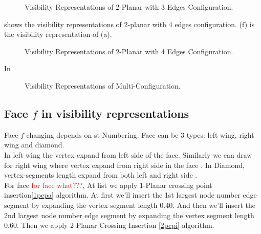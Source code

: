 \begin{figure}[!tb]
\centering
\resizebox{150mm}{!}{}
\caption{Visibility Representations of 2-Planar with 3 Edges Configuration.}
\label{fig:2planar3edgesvisi}
\end{figure}



 shows the visibility representations of 2-planar with 4 edges configuration. (f) is the visibility representation of (a).
\begin{figure}[!tb]
\centering
\resizebox{100mm}{!}{}
\caption{Visibility Representations of 2-Planar with 4 Edges Configuration.}
\label{fig:2planar4edgesvisi}
\end{figure}









In 
\begin{figure}[!tb]
\centering
\resizebox{150mm}{!}{}
\caption{Visibility Representations of Multi-Configuration.}
\label{fig:starvisi}
\end{figure}





\subsection{Face $f$ in visibility representations}

Face $f$ changing depends on st-Numbering. Face can be 3 types: left wing, right wing and diamond.
\\
In left wing  the vertex  expand from left side of the face. Similarly we can draw for right wing where vertex expand from right side in the face . In Diamond, vertex-segments length expand from both left and right side .
\\
For face \textcolor{red}{for face what???}, At fist we apply 1-Planar crossing point insertion\ref{1pcpa} algorithm. At first we'll insert the 1st largest node number edge segment by expanding the vertex segment length 0.40. And then we'll insert the 2nd largest node number edge segment by expanding the vertex segment length 0.60. Then we apply 2-Planar Crossing Insertion \ref{2pcpi} algorithm.



